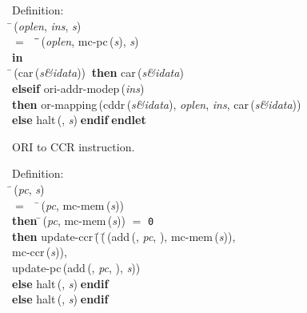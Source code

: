 \begin{tabbing}{\sc Definition}: \\  
\=\,({\it{oplen\/}}, {\it{ins\/}}, {\it{s\/}}) \\ 
$=$$\;\;\;\;$\=\=\,({\it{oplen\/}}, {\rm{mc-pc}}\,({\it{s\/}}), {\it{s\/}})\- \\ 
{\bf in} \\ 
\=\,({\rm{car}}\,({\it{s\&idata\/}}))$\;\;${\bf then }{\rm{car}}\,({\it{s\&idata\/}}) \\ 
{\bf elseif }{\rm{ori-addr-modep}}\,({\it{ins\/}}) \\ 
{\bf then }{\rm{or-mapping}}\,({\rm{cddr}}\,({\it{s\&idata\/}}), {\it{oplen\/}}, {\it{ins\/}}, {\rm{car}}\,({\it{s\&idata\/}})) \\ 
{\bf else }{\rm{halt}}\,({}, {\it{s\/}})$\;${\bf  endif}\-$\;${\bf  endlet}\-\-
\end{tabbing}

 ORI to CCR instruction.
\begin{tabbing}{\sc Definition}: \\  
\=\,({\it{pc\/}}, {\it{s\/}}) \\ 
$=$$\;\;\;\;$\=\,({\it{pc\/}}, {\rm{mc-mem}}\,({\it{s\/}})) \\ 
{\bf then }\=\,({\it{pc\/}}, {\rm{mc-mem}}\,({\it{s\/}})) $=$ {\tt{0}} \\ 
{\bf then }{\rm{update-ccr}}\,(\=\,(\=\,({\rm{add}}\,({}, {\it{pc\/}}, {}), {\rm{mc-mem}}\,({\it{s\/}})), \\ 
{\rm{mc-ccr}}\,({\it{s\/}}))\-, \\ 
{\rm{update-pc}}\,({\rm{add}}\,({}, {\it{pc\/}}, {}), {\it{s\/}}))\- \\ 
{\bf else }{\rm{halt}}\,({}, {\it{s\/}})$\;${\bf  endif}\- \\ 
{\bf else }{\rm{halt}}\,({}, {\it{s\/}})$\;${\bf  endif}\-\-
\end{tabbing}


